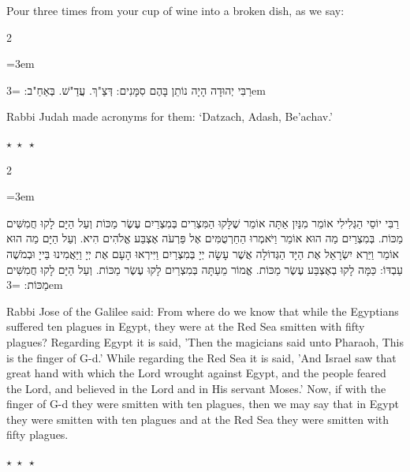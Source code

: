 \documentclass[11pt, openany]{book}
\newcommand{\instruction}[1]{%
  \par\vspace{3pt}
  \begin{tcolorbox}[
    enhanced,
    breakable,
    colback=sederlight,
    colframe=sedergold!40,
    boxrule=1pt,
    left=10pt,
    right=6pt,
    top=4pt,
    bottom=4pt,
    borderline west={3pt}{0pt}{sederwine!60},
    arc=6pt,
    outer arc=6pt,
  ]
    {\kidsinstructionfont\small\textcolor{sederwine}{#1}}
  \end{tcolorbox}
  \par\vspace{2pt}
}
\newenvironment{bilingual}{%
  \par\vspace{4pt}%
  \begin{paracol}{2}%
}{%
  \end{paracol}%
  \par\vspace{2pt}%
}
\newenvironment{hebrewcol}{%
  \switchcolumn[1]%
  \begingroup
  \RTL
  \hebrewfont\large
  \setstretch{1.4}%
  \emergencystretch=3em
  \tolerance=9999
  \parindent=0pt\relax
}{%
  \endRTL
  \endgroup
}
\newenvironment{englishcol}{%
  \switchcolumn[0]%
  \begingroup
  \setstretch{1.4}%
  \emergencystretch=3em
  \tolerance=9999
  \normalsize
  \rightskip=0.12in\relax
}{%
  \endgroup
}
\newcommand{\parasep}{%
  \par\vspace{3pt}
  \begin{center}
    \textcolor{sedergold!50}{\small$\star\;\star\;\star$}
  \end{center}
  \par\vspace{3pt}
}
\begin{document}
\instruction{Pour three times from your cup of wine into a broken dish, as we say:}

\begin{bilingual}
\begin{hebrewcol}
רַבִּי יְהוּדָה הָיָה נוֹתֵן בָּהֶם סִמָּנִים:
דְּצַ"ךְ. עֲדַ"שׁ. בְּאַחַ"ב:
\end{hebrewcol}
\begin{englishcol}
Rabbi Judah made acronyms for them: `Datzach, Adash, Be'achav.'
\end{englishcol}
\end{bilingual}
\parasep

\begin{bilingual}
\begin{hebrewcol}
רַבִּי יוֹסֵי הַגְּלִילִי אוֹמֵר מִנַּיִן אַתָּה אוֹמֵר שֶׁלָּקוּ הַמִּצְרִים בְּמִצְרַיִם עֶשֶׂר מַכּוֹת וְעַל הַיָּם לָקוּ חֲמִשִּׁים מַכּוֹת. בְּמִצְרַיִם מַה הוּא אוֹמֵר וַיֹּאמְרוּ הַחַרְטֻמִּים אֶל פַּרְעֹה אֶצְבַּע אֱלֹהִים הִיא. וְעַל הַיָּם מַה הוּא אוֹמֵר וַיַּרְא יִשְׂרָאֵל אֶת הַיָּד הַגְּדוֹלָה אֲשֶׁר עָשָׂה יְיָ בְּמִצְרַיִם וַיִּירְאוּ הָעָם אֶת יְיָ וַיַּאֲמִינוּ בַּייָ וּבְמֹשֶׁה עַבְדּוֹ: כַּמָּה לָקוּ בְאֶצְבַּע עֶשֶׂר מַכּוֹת. אֱמוֹר מֵעַתָּה בְּמִצְרַיִם לָקוּ עֶשֶׂר מַכּוֹת. וְעַל הַיָּם לָקוּ חֲמִשִּׁים מַכּוֹת:
\end{hebrewcol}
\begin{englishcol}
Rabbi Jose of the Galilee said: From where do we know that while the Egyptians suffered ten plagues in Egypt, they were at the Red Sea smitten with fifty plagues? Regarding Egypt it is said, 'Then the magicians said unto Pharaoh, This is the finger of G-d.' While regarding the Red Sea it is said, 'And Israel saw that great hand with which the Lord wrought against Egypt, and the people feared the Lord, and believed in the Lord and in His servant Moses.' Now, if with the finger of G-d they were smitten with ten plagues, then we may say that in Egypt they were smitten with ten plagues and at the Red Sea they were smitten with fifty plagues.
\end{englishcol}
\end{bilingual}
\parasep
\end{document}
